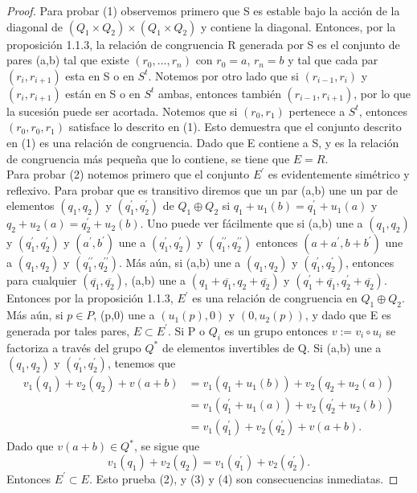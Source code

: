 \documentclass[12pt,spanish]{amsart}
\theoremstyle{definition}
\theoremstyle{remark}
\begin{document}
\begin{proof}
Para probar (1) observemos primero que S es estable bajo la acción de la diagonal de  $(Q_{1} \times Q_{2})\times (Q_{1}\times Q_{2})$ y contiene la diagonal. Entonces, por la proposición 1.1.3, la relación de congruencia R generada por S es el conjunto de pares (a,b) tal que existe $(r_{0},...,r_{n})$ con $r_{0}=a$, $r_{n}=b$ y tal que cada par $(r_{i},r_{i+1})$ esta en S o en $S^{t}$. Notemos por otro lado que si $(r_{i-1},r_{i})$ y $(r_{i},r_{i+1})$ están en S o en $S^{t}$ ambas, entonces también $(r_{i-1},r_{i+1})$, por lo que la sucesión puede ser acortada. Notemos que si $(r_{0},r_{1})$ pertenece a $S^{t}$, entonces $(r_{0},r_{0},r_{1})$ satisface lo descrito en (1). Esto demuestra que el conjunto descrito en (1) es una relación de congruencia. Dado que E contiene a S, y es la relación de congruencia más pequeña que lo contiene, se tiene que $E=R$. \\
Para probar (2) notemos primero que el conjunto $E^{\prime}$ es evidentemente simétrico y reflexivo. Para probar que es transitivo diremos que un par (a,b) une un par de elementos $(q_{1},q_{2})$ y $(q_{1}^{\prime},q_{2}^{\prime})$ de $Q_{1}\oplus Q_{2}$ si $q_{1}+u_{1}(b)=q_{1}^{\prime}+u_{1}(a)$ y $q_{2}+u_{2}(a)=q_{2}^{\prime}+u_{2}(b)$. Uno puede ver fácilmente que si (a,b) une a $(q_{1},q_{2})$ y $(q_{1}^{\prime},q_{2}^{\prime})$ y $(a^{\prime},b^{\prime})$ une a $(q_{1}^{\prime},q_{2}^{\prime})$ y $(q_{1}^{\prime \prime},q_{2}^{\prime \prime})$ entonces $(a+a^{\prime},b+b^{\prime})$ une a $(q_{1},q_{2})$ y $(q_{1}^{\prime \prime},q_{2}^{\prime \prime})$. Más aún, si (a,b) une a $(q_{1},q_{2})$ y $(q_{1}^{\prime},q_{2}^{\prime })$, entonces para cualquier $(\overline{q_{1}},\overline{q_{2}})$, (a,b) une a $(q_{1}+\overline{q_{1}},q_{2}+\overline{q_{2}})$ y $(q_{1}^{\prime}+\overline{q_{1}},q_{2}^{\prime}+\overline{q_{2}})$. Entonces por la proposición 1.1.3, $E^{\prime}$ es una relación de congruencia en $Q_{1}\oplus Q_{2}$. Más aún, si $p\in P$, (p,0) une a $(u_{1}(p),0)$ y $(0,u_{2}(p))$, y dado que E es generada por tales pares, $E\subset E^{\prime}$. Si P o $Q_{i}$ es un grupo entonces $v:=v_{i}\circ u_{i}$
se factoriza a través del grupo $Q^{\ast}$ de elementos invertibles de Q. Si (a,b) une a $(q_{1},q_{2})$ y $(q_{1}^{\prime},q_{2}^{\prime})$, tenemos que 
\begin{equation*}
\begin{split}
v_{1}(q_{1})+v_{2}(q_{2})+v(a+b) &= v_{1}(q_{1}+u_{1}(b))+v_{2}(q_{2}+u_{2}(a)) \\
&= v_{1}(q_{1}^{\prime}+u_{1}(a))+v_{2}(q_{2}^{\prime}+u_{2}(b)) \\
&= v_{1}(q_{1}^{\prime})+v_{2}(q_{2}^{\prime})+v(a+b).
\end{split}
\end{equation*}
Dado que $v(a+b)\in Q^{\ast}$, se sigue que 
$$v_{1}(q_{1})+v_{2}(q_{2})=v_{1}(q_{1}^{\prime})+v_{2}(q_{2}^{\prime}).$$
Entonces $E^{\prime}\subset E$. Esto prueba (2), y (3) y (4) son consecuencias inmediatas.
\end{proof}
\end{document}
